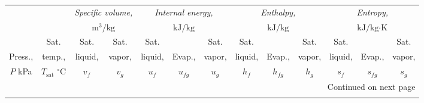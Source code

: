 \documentclass[12pt,a3paper]{article}
\begin{document}
\begin{enumerate}
\begin{center}
\small
\begin{longtable}{c c c c c c c c c c c c c}
\toprule\toprule
& & \multicolumn{2}{c}{\textit{Specific volume,}} & \multicolumn{3}{c}{\textit{Internal energy,}} & \multicolumn{3}{c}{\textit{Enthalpy,}} & \multicolumn{3}{c}{\textit{Entropy,}} \\
& & \multicolumn{2}{c}{$\text{m}^3\text{/kg}$} & \multicolumn{3}{c}{$\text{kJ/kg}$} & \multicolumn{3}{c}{$\text{kJ/kg}$} & \multicolumn{3}{c}{$\text{kJ/kg}\cdot\text{K}$} \\
\cmidrule(lr){3-4} \cmidrule(lr){5-7} \cmidrule(lr){8-10} \cmidrule(lr){11-13}
& Sat. & Sat. & Sat. & Sat. & & Sat. & Sat. & & Sat. & Sat. & & Sat. \\
Press., & temp., & liquid, & vapor, & liquid, & Evap., & vapor, & liquid, & Evap., & vapor, & liquid, & Evap., & vapor, \\
$P$ kPa & $T_{\text{sat}}$ $^\circ\text{C}$ & $v_f$ & $v_g$ & $u_f$ & $u_{fg}$ & $u_g$ & $h_f$ & $h_{fg}$ & $h_g$ & $s_f$ & $s_{fg}$ & $s_g$ \\
\midrule
\endhead

\midrule
\multicolumn{13}{r}{{Continued on next page}} \\
\bottomrule
\endfoot

\bottomrule\bottomrule
\endlastfoot


\end{longtable}
\end{center}
\end{enumerate}
\end{document}
